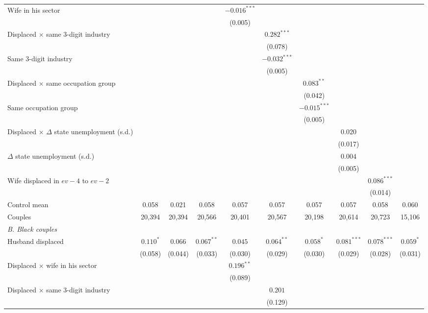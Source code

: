 \begin{table}[htbp]
{\begin{tabular}{lccccccccc}
Wife in his sector &  &  &  & $-0.016^{***}$ &  &  &  &  &  \\
 &  &  &  & (0.005) &  &  &  &  &  \\
Displaced $\times$ same 3-digit industry &  &  &  &  & $0.282^{***}$ &  &  &  &  \\
 &  &  &  &  & (0.078) &  &  &  &  \\
Same 3-digit industry &  &  &  &  & $-0.032^{***}$ &  &  &  &  \\
 &  &  &  &  & (0.005) &  &  &  &  \\
Displaced $\times$ same occupation group &  &  &  &  &  & $0.083^{**}$ &  &  &  \\
 &  &  &  &  &  & (0.042) &  &  &  \\
Same occupation group &  &  &  &  &  & $-0.015^{***}$ &  &  &  \\
 &  &  &  &  &  & (0.005) &  &  &  \\
Displaced $\times$ $\Delta$ state unemployment (s.d.) &  &  &  &  &  &  & $0.020$ &  &  \\
 &  &  &  &  &  &  & (0.017) &  &  \\
$\Delta$ state unemployment (s.d.) &  &  &  &  &  &  & $0.004$ &  &  \\
 &  &  &  &  &  &  & (0.005) &  &  \\
Wife displaced in $ev-4$ to $ev-2$ &  &  &  &  &  &  &  & $0.086^{***}$ &  \\
 &  &  &  &  &  &  &  & (0.014) &  \\
Control mean & 0.058 & 0.021 & 0.058 & 0.057 & 0.057 & 0.057 & 0.057 & 0.058 & 0.060 \\
Couples & 20,394 & 20,394 & 20,566 & 20,401 & 20,567 & 20,198 & 20,614 & 20,723 & 15,106 \\
\multicolumn{10}{l}{\textit{B. Black couples}} \\
Husband displaced & $0.110^{*}$ & $0.066$ & $0.067^{**}$ & $0.045$ & $0.064^{**}$ & $0.058^{*}$ & $0.081^{***}$ & $0.078^{***}$ & $0.059^{*}$ \\
 & (0.058) & (0.044) & (0.033) & (0.030) & (0.029) & (0.030) & (0.029) & (0.028) & (0.031) \\
Displaced $\times$ wife in his sector &  &  &  & $0.196^{**}$ &  &  &  &  &  \\
 &  &  &  & (0.089) &  &  &  &  &  \\
Displaced $\times$ same 3-digit industry &  &  &  &  & $0.201$ &  &  &  &  \\
 &  &  &  &  & (0.129) &  &  &  &  \\

\end{tabular}}
\end{table}
